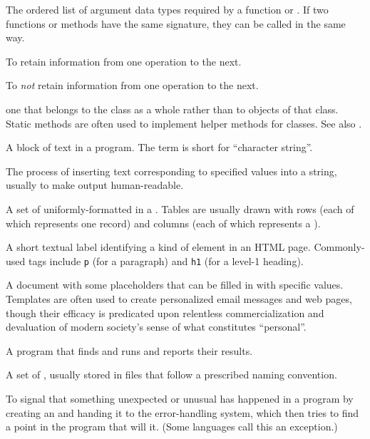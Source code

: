 \begin{description}
The ordered list of argument data types required by a function or
. If two functions or methods have the same signature,
they can be called in the same way.

To retain information from one operation to the next.

To \emph{not} retain information from one operation to the next.

one that belongs to the class as a whole rather than to objects of that class.
Static methods are often used to implement helper methods for classes.
See also .

A block of text in a program. The term is short for ``character string''.

The process of inserting text corresponding to specified values into a string,
usually to make output human-readable.

A set of uniformly-formatted  in a . Tables are usually drawn with rows (each
of which represents one record) and columns (each of which represents a
).

A short textual label identifying a kind of element in an HTML page.
Commonly-used tags include \texttt{p} (for a paragraph) and \texttt{h1} (for a level-1
heading).

A document with some placeholders that can be filled in with specific values.
Templates are often used to create personalized email messages and web pages,
though their efficacy is predicated upon relentless commercialization and
devaluation of modern society's sense of what constitutes ``personal''.

A program that finds and runs  and reports their
results.

A set of , usually stored in files that follow a
prescribed naming convention.

To signal that something unexpected or unusual has happened in a program by
creating an  and handing it to the error-handling
system, which then tries to find a point in the program that will
 it. (Some languages call this \emph{} an
exception.)


\end{description}
